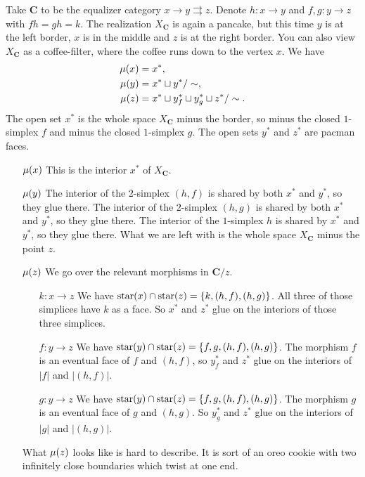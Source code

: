 \begin{example}
\label{ex:ST of the equalizer category}
Take $\mathbf{C}$ to be the equalizer category $x \to y \rightrightarrows z$. Denote $h : x \to y$ and $f,g : y \to z$ with $fh = gh = k$. The realization $X_\mathbf{C}$ is again a pancake, but this time $y$ is at the left border, $x$ is in the middle and $z$ is at the right border. You can also view $X_\mathbf{C}$ as a coffee-filter, where the coffee runs down to the vertex $x$. We have
\begin{align*}
\operatorname{\mu}(x) &= x^*, \\
\operatorname{\mu}(y) &= x^* \sqcup y^* / \sim, \\
\operatorname{\mu}(z) &= x^* \sqcup y^*_f \sqcup y^*_g \sqcup z^* / \sim.
\end{align*}
The open set $x^*$ is the whole space $X_\mathbf{C}$ minus the border, so minus the closed $1$-simplex $f$ and minus the closed $1$-simplex $g$. The open sets $y^*$ and $z^*$ are pacman faces.

\begin{itemize}
	\item [$\operatorname{\mu}(x)$] This is the interior $x^*$ of $X_\mathbf{C}$.
	\item [$\operatorname{\mu}(y)$] The interior of the $2$-simplex $(h,f)$ is shared by both $x^*$ and $y^*$, so they glue there. The interior of the $2$-simplex $(h,g)$ is shared by both $x^*$ and $y^*$, so they glue there. The interior of the $1$-simplex $h$ is shared by $x^*$ and $y^*$, so they glue there. What we are left with is the whole space $X_\mathbf{C}$ minus the point $z$.
	\item [$\operatorname{\mu}(z)$] We go over the relevant morphisms in $\mathbf{C}/z$.
	\begin{itemize}
	\item [$k : x \to z$] We have $\operatorname{star}(x) \cap \operatorname{star}(z) = \{k, (h,f), (h,g)\}$. All three of those simplices have $k$ as a face. So $x^*$ and $z^*$ glue on the interiors of those three simplices.
	\item [$f : y \to z$] We have $\operatorname{star}(y) \cap \operatorname{star}(z) = \{f, g, (h,f), (h,g)\}$. The morphism $f$ is an eventual face of $f$ and $(h,f)$, so $y^*_f$ and $z^*$ glue on the interiors of $|f|$ and $|(h,f)|$.
	\item [$g : y \to z$] We have $\operatorname{star}(y) \cap \operatorname{star}(z) = \{f, g, (h,f), (h,g)\}$. The morphism $g$ is an eventual face of $g$ and $(h,g)$. So $y^*_g$ and $z^*$ glue on the interiors of $|g|$ and $|(h,g)|$.
	\end{itemize}
	What $\operatorname{\mu}(z)$ looks like is hard to describe. It is sort of an oreo cookie with two infinitely close boundaries which twist at one end.
\end{itemize}
\end{example}

